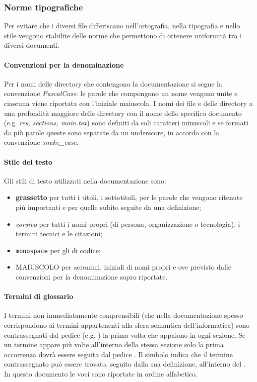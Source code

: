 \subsubsection{Norme tipografiche} \label{_normetipografiche}
Per evitare che i diversi file differiscano nell'ortografia, nella tipografia e nello stile vengono stabilite delle norme che permettono di ottenere uniformità tra i diversi documenti.

\paragraph{Convenzioni per la denominazione}
Per i nomi delle directory che contengono la documentazione si segue la convenzione \textit{PascalCase}: le parole che compongono un nome vengono unite e ciascuna viene riportata con l'iniziale maiuscola. I nomi dei file  e delle directory a una profondità maggiore delle directory con il nome dello specifico documento (e.g. \textit{res, sections, main.tex}) sono definiti da soli caratteri minuscoli e se formati da più parole queste sono separate da un underscore,  in accordo con la convenzione \textit{snake\_case}.

\paragraph{Stile del testo}
Gli stili di testo utilizzati nella documentazione sono:
\begin{itemize}
\item\textbf{grassetto} per tutti i titoli, i sottotitoli, per le parole che vengono ritenute più importanti e per quelle subito seguite da una definizione;
\item \textit{corsivo} per tutti i nomi propri (di persona, organizzazione o tecnologia), i termini tecnici e le citazioni;
\item \texttt{monospace} per gli  di codice;
\item MAIUSCOLO per acronimi, iniziali di nomi propri e ove previsto dalle convenzioni per la denominazione sopra riportate.
\end{itemize}

\paragraph{Termini di glossario}
I termini non immediatamente comprensibili (che nella documentazione spesso corrispondono ai termini appartenenti alla sfera semantica dell'informatica) sono contrassegnati dal pedice \glock{} (e.g. ) la prima volta che appaiono in ogni sezione. Se un termine appare più volte all'interno della stessa sezione solo la prima occorrenza dovrà essere seguita dal pedice \glock{}. Il simbolo indica che il termine contrassegnato può essere trovato, seguito dalla sua definizione, all'interno del . In questo documento le voci sono riportate in ordine alfabetico.  

